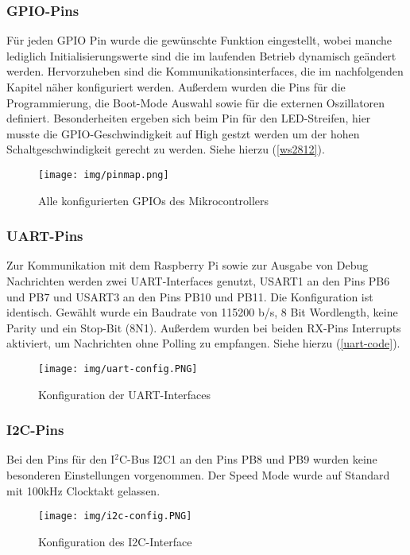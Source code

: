 \documentclass[12pt, a4paper]{report}
\begin{document}
         \subsubsection{GPIO-Pins}
         Für jeden GPIO Pin wurde die gewünschte Funktion eingestellt, wobei manche lediglich Initialisierungswerte sind die im laufenden Betrieb dynamisch geändert werden.
         Hervorzuheben sind die Kommunikationsinterfaces, die im nachfolgenden Kapitel näher konfiguriert werden. 
         Außerdem wurden die Pins für die Programmierung, die Boot-Mode Auswahl sowie für die externen Oszillatoren definiert. Besonderheiten ergeben sich beim Pin für den LED-Streifen, hier musste die GPIO-Geschwindigkeit auf High gestzt werden um der hohen Schaltgeschwindigkeit gerecht zu werden. Siehe hierzu (\ref{ws2812}).
         \begin{figure}[H]
            \centering
            \texttt{[image: img/pinmap.png]}
            \caption{Alle konfigurierten GPIOs des Mikrocontrollers}
         \end{figure}
         
         \subsubsection{UART-Pins}
         Zur Kommunikation mit dem Raspberry Pi sowie zur Ausgabe von Debug Nachrichten werden zwei UART-Interfaces genutzt, USART1 an den Pins PB6 und PB7 und USART3 an den Pins PB10 und PB11. Die Konfiguration ist identisch. Gewählt wurde
         ein Baudrate von 115200 b/s, 8 Bit Wordlength, keine Parity und ein Stop-Bit (8N1). Außerdem wurden bei beiden RX-Pins Interrupts aktiviert, um Nachrichten ohne Polling zu empfangen. Siehe hierzu (\ref{uart-code}).
         \begin{figure}[H]
            \centering
            \texttt{[image: img/uart-config.PNG]}
            \caption{Konfiguration der UART-Interfaces}
         \end{figure}
         \subsubsection{I2C-Pins}
         Bei den Pins für den I$^2$C-Bus I2C1 an den Pins PB8 und PB9 wurden keine besonderen Einstellungen vorgenommen. Der Speed Mode wurde auf Standard mit 100kHz Clocktakt gelassen.
         \begin{figure}[H]
            \centering
            \texttt{[image: img/i2c-config.PNG]}
            \caption{Konfiguration des I2C-Interface}
         \end{figure}
\end{document}
